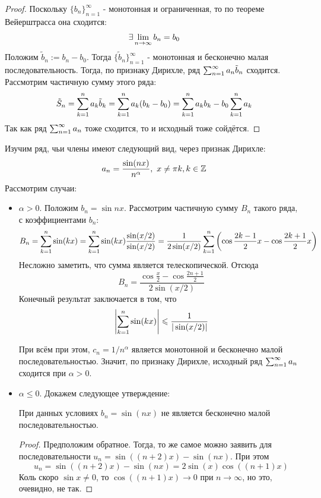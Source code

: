 \begin{proof}
	Поскольку $\{b_n\}_{n = 1}^\infty$ - монотонная и ограниченная, то по теореме Вейерштрасса она сходится:
	\[
		\exists \lim\limits_{n \to \infty} b_n = b_0
	\]
	Положим $\tilde{b}_n := b_n - b_0$. Тогда $\{\tilde{b}_n\}_{n = 1}^\infty$ - монотонная и бесконечно малая последовательность. Тогда, по признаку Дирихле, ряд $\sum_{n = 1}^\infty a_n \tilde{b}_n$ сходится. Рассмотрим частичную сумму этого ряда:
	\[
		\tilde{S}_n = \sum\limits_{k = 1}^n a_k \tilde{b}_k = \sum\limits_{k = 1}^n a_k (b_k - b_0) = \sum\limits_{k = 1}^n a_k b_k - b_0\sum\limits_{k = 1}^n a_k
	\]
	Так как ряд $\sum_{n = 1}^\infty a_n$ тоже сходится, то и исходный тоже сойдётся.
\end{proof}

\begin{example}
	Изучим ряд, чьи члены имеют следующий вид, через признак Дирихле:
	\[
		a_n = \frac{\sin (nx)}{n^\alpha},\ x \neq \pi k, k \in \mathbb{Z}
	\]
	Рассмотрим случаи:
	\begin{itemize}
		\item $\alpha > 0$. Положим $b_n = \sin nx$. Рассмотрим частичную сумму $B_n$ такого ряда, с коэффициентами $b_n$:
		\[
			B_n = \sum\limits_{k = 1}^n \sin (kx) = \sum\limits_{k = 1}^n \sin (kx) \frac{\sin (x / 2)}{\sin (x / 2)} = \frac{1}{2\sin (x / 2)} \sum\limits_{k = 1}^n \left(\cos \frac{2k - 1}{2}x - \cos \frac{2k + 1}{2}x\right)
		\]
		Несложно заметить, что сумма является телескопической. Отсюда
		\[
			B_n = \frac{\cos \frac{x}{2} - \cos \frac{2n + 1}{2}}{2 \sin (x / 2)}
		\]
		Конечный результат заключается в том, что
		\[
			\left|\sum\limits_{k = 1}^n \sin (kx)\right| \leqslant \frac{1}{|\sin (x / 2)|}
		\]
		
		При всём при этом, $c_n = 1 / n^\alpha$ является монотонной и бесконечно малой последовательностью. Значит, по признаку Дирихле, исходный ряд $\sum_{n = 1}^\infty a_n$ сходится при $\alpha > 0$.
		
		\item $\alpha \le 0$. Докажем следующее утверждение:
		\begin{lemma}
			При данных условиях $b_n = \sin (nx)$ не является бесконечно малой последовательностью.
		\end{lemma}
	
		\begin{proof}
			Предположим обратное. Тогда, то же самое можно заявить для последовательности $u_n = \sin ((n + 2)x) - \sin (nx)$. При этом
			\[
				u_n = \sin ((n + 2)x) - \sin (nx) = 2 \sin (x) \cos ((n + 1)x)
			\]
			Коль скоро $\sin x \neq 0$, то $\cos ((n + 1)x) \to 0$ при $n \to \infty$, но это, очевидно, не так.
		\end{proof}
	

\end{itemize}
\end{example}
